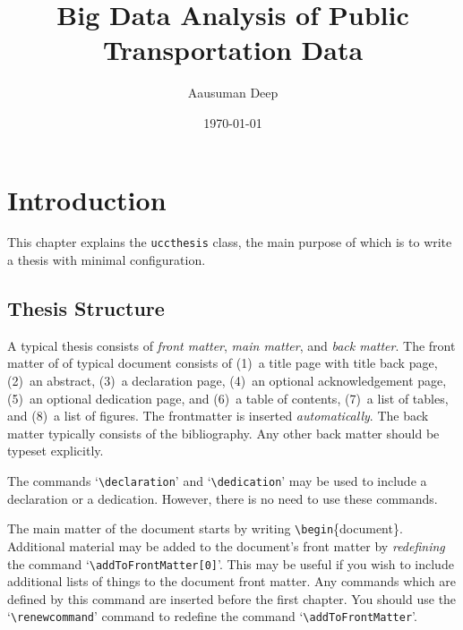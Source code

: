 \documentclass[MScDSA]{uccthesis}
\title{Big Data Analysis of Public Transportation Data}
\author{Aausuman Deep}
\date{\today}
\newcommand*{\COMMAND}[1]{\texttt{\textbackslash #1}}
\newcommand*{\COMMANDWITHARGUMENT}[2]{\texttt{\textbackslash #1}\{#2\}}
\begin{document}
   \chapter{Introduction}
      This chapter explains the \texttt{uccthesis} class,
       the main purpose of which is to write a thesis
       with minimal configuration.

   \section{Thesis Structure}
      A typical thesis consists of
       \emph{front matter},
       \emph{main matter}, and
       \emph{back matter}.
      The front matter of
        of typical document consists of
       (1)~a title page with title back page,
       (2)~an abstract,
       (3)~a declaration page,
       (4)~an optional acknowledgement page,
       (5)~an optional dedication page, and
       (6)~a table of contents,
       (7)~a list of tables, and
       (8)~a list of figures.
      The frontmatter is inserted \emph{automatically}.
      The back matter typically
       consists of the bibliography.
      Any other back matter should be typeset explicitly.

      The commands `\COMMAND{declaration}' and
       `\COMMAND{dedication}' may be used to
       include a declaration or a dedication.
      However, there is no need to use these commands.

      The main matter of the document
       starts by writing \COMMANDWITHARGUMENT{begin}{document}.
      Additional material may be added
       to the document's front matter by \emph{redefining} the command
       \label{addToFrontMatter}
       `\COMMAND{addToFrontMatter[0]}'.
      This may be useful if you wish to include
       additional lists of things to the document front matter.
      Any commands which are defined by this command
       are inserted before the first chapter.
      You should use the `\COMMAND{renewcommand}'
       command to redefine the command
       `\COMMAND{addToFrontMatter}'.
\end{document}
